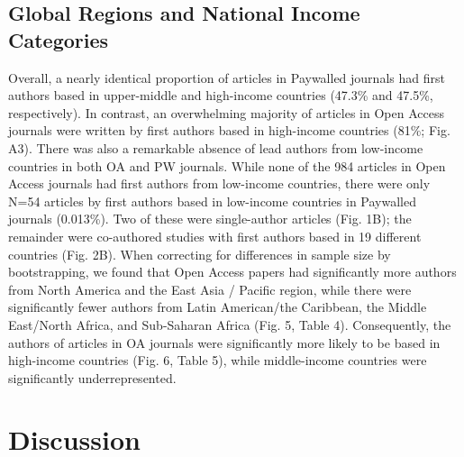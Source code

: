 \documentclass[
  english,
  man]{apa6}
\begin{document}
\hypertarget{global-regions-and-national-income-categories}{%
\subsection{Global Regions and National Income Categories}\label{global-regions-and-national-income-categories}}

Overall, a nearly identical proportion of articles in Paywalled journals had first authors based in upper-middle and high-income countries (47.3\% and 47.5\%, respectively). In contrast, an overwhelming majority of articles in Open Access journals were written by first authors based in high-income countries (81\%; Fig. A3). There was also a remarkable absence of lead authors from low-income countries in both OA and PW journals. While none of the 984 articles in Open Access journals had first authors from low-income countries, there were only N=54 articles by first authors based in low-income countries in Paywalled journals (0.013\%). Two of these were single-author articles (Fig. 1B); the remainder were co-authored studies with first authors based in 19 different countries (Fig. 2B). When correcting for differences in sample size by bootstrapping, we found that Open Access papers had significantly more authors from North America and the East Asia / Pacific region, while there were significantly fewer authors from Latin American/the Caribbean, the Middle East/North Africa, and Sub-Saharan Africa (Fig. 5, Table 4). Consequently, the authors of articles in OA journals were significantly more likely to be based in high-income countries (Fig. 6, Table 5), while middle-income countries were significantly underrepresented.

\hypertarget{discussion}{%
\section{Discussion}\label{discussion}}
\end{document}
